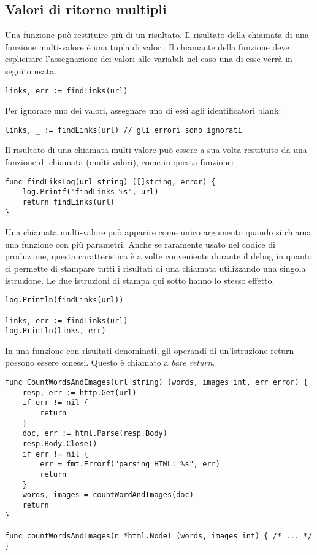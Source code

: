 \documentclass[../../thesis.tex]{subfiles}
\begin{document}
    \subsection{Valori di ritorno multipli}\label{subsec:valori-di-ritorno-multipli}
    Una funzione può restituire più di un risultato.
    Il risultato della chiamata di una funzione multi-valore è una tupla di valori.
    Il chiamante della funzione deve esplicitare l'assegnazione dei valori alle variabili nel caso una di esse verrà in seguito usata.
    \begin{lstlisting}[frame = single,label={lst:lstlisting4-3.1}]
links, err := findLinks(url)
    \end{lstlisting}
    Per ignorare uno dei valori, assegnare uno di essi agli identificatori blank:
    \begin{lstlisting}[frame = single,label={lst:lstlisting4-3.2}]
links, _ := findLinks(url) // gli errori sono ignorati
    \end{lstlisting}
    Il risultato di una chiamata multi-valore può essere a sua volta restituito da una funzione di chiamata (multi-valori), come in questa funzione:
    \begin{lstlisting}[frame = single,label={lst:lstlisting4-3.3}]
func findLiksLog(url string) ([]string, error) {
    log.Printf("findLinks %s", url)
    return findLinks(url)
}
    \end{lstlisting}
    Una chiamata multi-valore può apparire come unico argomento quando si chiama una funzione con più parametri.
    Anche se raramente usato nel codice di produzione, questa caratteristica è a volte conveniente durante il debug in quanto ci permette di stampare tutti i risultati di una chiamata utilizzando una singola istruzione.
    Le due istruzioni di stampa qui sotto hanno lo stesso effetto.
    \begin{lstlisting}[frame = single,label={lst:lstlisting4-3.4}]
log.Println(findLinks(url))

links, err := findLinks(url)
log.Println(links, err)
    \end{lstlisting}
    In una funzione con risultati denominati, gli operandi di un'istruzione return possono essere omessi.
    Questo è chiamato a \textit{bare return}.
    \begin{lstlisting}[frame = single,label={lst:lstlisting4-3.5}]
func CountWordsAndImages(url string) (words, images int, err error) {
    resp, err := http.Get(url)
    if err != nil {
        return
    }
    doc, err := html.Parse(resp.Body)
    resp.Body.Close()
    if err != nil {
        err = fmt.Errorf("parsing HTML: %s", err)
        return
    }
    words, images = countWordAndImages(doc)
    return
}

func countWordsAndImages(n *html.Node) (words, images int) { /* ... */ }
    \end{lstlisting}
\end{document}
